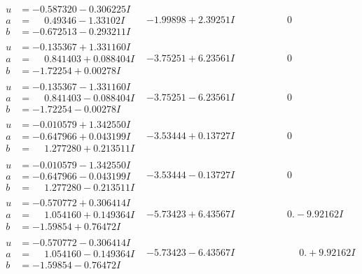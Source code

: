 \documentclass[1p]{elsarticle_modified}
\theoremstyle{definition}
\begin{document}
$$\begin{array}{c|c|c}
\begin{aligned}
u &= -0.587320 - 0.306225 I \\
a &= \phantom{-}0.49346 - 1.33102 I \\
b &= -0.672513 - 0.293211 I\end{aligned}
 & -1.99898 + 2.39251 I & \phantom{-0.000000 } 0 \\ \hline\begin{aligned}
u &= -0.135367 + 1.331160 I \\
a &= \phantom{-}0.841403 + 0.088404 I \\
b &= -1.72254 + 0.00278 I\end{aligned}
 & -3.75251 + 6.23561 I & \phantom{-0.000000 } 0 \\ \hline\begin{aligned}
u &= -0.135367 - 1.331160 I \\
a &= \phantom{-}0.841403 - 0.088404 I \\
b &= -1.72254 - 0.00278 I\end{aligned}
 & -3.75251 - 6.23561 I & \phantom{-0.000000 } 0 \\ \hline\begin{aligned}
u &= -0.010579 + 1.342550 I \\
a &= -0.647966 + 0.043199 I \\
b &= \phantom{-}1.277280 + 0.213511 I\end{aligned}
 & -3.53444 + 0.13727 I & \phantom{-0.000000 } 0 \\ \hline\begin{aligned}
u &= -0.010579 - 1.342550 I \\
a &= -0.647966 - 0.043199 I \\
b &= \phantom{-}1.277280 - 0.213511 I\end{aligned}
 & -3.53444 - 0.13727 I & \phantom{-0.000000 } 0 \\ \hline\begin{aligned}
u &= -0.570772 + 0.306414 I \\
a &= \phantom{-}1.054160 + 0.149364 I \\
b &= -1.59854 + 0.76472 I\end{aligned}
 & -5.73423 + 6.43567 I & \phantom{-0.000000 } 0. - 9.92162 I \\ \hline\begin{aligned}
u &= -0.570772 - 0.306414 I \\
a &= \phantom{-}1.054160 - 0.149364 I \\
b &= -1.59854 - 0.76472 I\end{aligned}
 & -5.73423 - 6.43567 I & \phantom{-0.000000 -}0. + 9.92162 I \\ \hline\begin{aligned}

\end{aligned}
\end{array}$$
\end{document}
